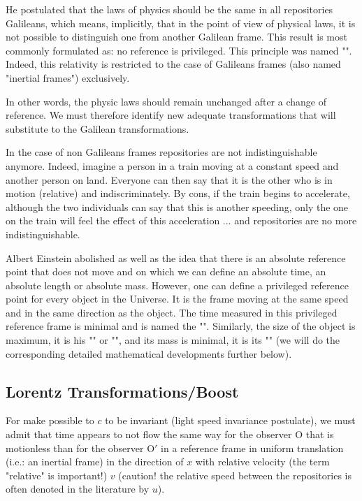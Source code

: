 	He postulated that the laws of physics should be the same in all repositories Galileans, which means, implicitly, that in the point of view of physical laws, it is not possible to distinguish one from another Galilean frame. This result is most commonly formulated as: no reference is privileged. This principle was named "". Indeed, this relativity is restricted to the case of Galileans frames (also named "inertial frames") exclusively.
	
	In other words, the physic laws should remain unchanged after a change of reference. We must therefore identify new adequate transformations that will substitute to the Galilean transformations.
	
	In the case of non Galileans frames repositories are not indistinguishable anymore. Indeed, imagine a person in a train moving at a constant speed and another person on land. Everyone can then say that it is the other who is in motion (relative) and indiscriminately. By cons, if the train begins to accelerate, although the two individuals can say that this is another speeding, only the one on the train will feel the effect of this acceleration ... and repositories are no more indistinguishable.
	
	Albert Einstein abolished as well as the idea that there is an absolute reference point that does not move and on which we can define an absolute time, an absolute length or absolute mass. However, one can define a privileged reference point for every object in the Universe. It is the frame moving at the same speed and in the same direction as the object. The time measured in this privileged reference frame is minimal and is named the "". Similarly, the size of the object is maximum, it is his "" or "", and its mass is minimal, it is its "" (we will do the corresponding detailed mathematical developments further below).
	
		\subsection{Lorentz Transformations/Boost}\label{lorentz transformations}
		For make possible to $c$ to be invariant (light speed invariance postulate), we must admit that time appears to not flow the same way for the observer $\text{O}$ that is motionless than for the observer $\text{O}'$ in a reference frame in uniform translation (i.e.: an inertial frame) in the direction of $x$  with relative velocity (the term "relative" is important!) $v$ (caution! the relative speed between the repositories is often denoted in the literature by $u$).

